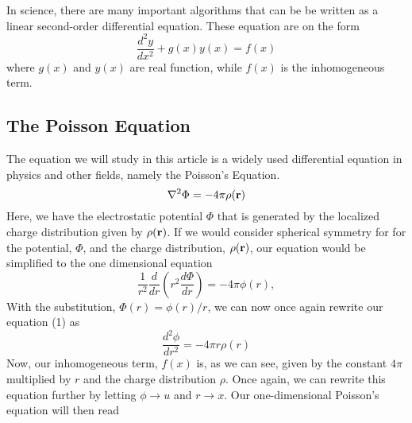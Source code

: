 \documentclass{article}
\begin{document}
In science, there are many important algorithms that can be be written as a linear second-order differential equation. These equation are on the form
$$\frac{d^{2}y}{dx^{2}} + g(x)y(x) = f(x)$$
where $g(x)$ and $y(x)$ are real function, while $f(x)$ is the inhomogeneous term.
\newline
\subsection{The Poisson Equation} 

\newline The equation we will study in this article is a widely used differential equation in physics and other fields, namely the Poisson's Equation.
\begin{equation}
    \laplacian \Phi = -4 \pi \rho(\vb{r}) %
\end{equation}
Here, we have the electrostatic potential $\Phi$ that is generated by the localized charge distribution given by $\rho(\vb{r})$.
\newline
If we would consider spherical symmetry for for the potential, $\Phi$, and the charge distribution, $\rho(\vb{r})$, our equation would be simplified to the one dimensional equation
$$
    \frac{1}{r^2}\frac{d}{dr}\left( r^2 \frac{d\Phi}{dr} \right) = -4\pi\phi(r),
$$
With the substitution, $\Phi(r)=\phi(r)/r$, we can now once again rewrite our equation (1) as
$$
    \frac{d^2\phi}{dr^2} = -4\pi r \rho(r)
$$
Now, our inhomogeneous term, $f(x)$ is, as we can see, given by the constant $4\pi$ multiplied by $r$ and the charge distribution $\rho$.
\newline\newline
Once again, we can rewrite this equation further by letting $\phi \rightarrow u$ and $r \rightarrow x$. Our one-dimensional Poisson's equation will then read
\end{document}
